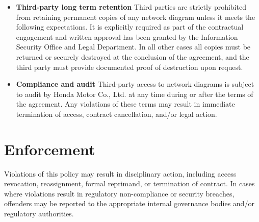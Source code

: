 \begin{itemize}
    \item \textbf{Third-party long term retention}
    Third parties are strictly prohibited from retaining permanent copies of any network diagram unless it meets the following expectations. It is explicitly required as part of the contractual engagement and written approval has been granted by the Information Security Office and Legal Department. In all other cases all copies must be returned or securely destroyed at the conclusion of the agreement, and the third party must provide documented proof of destruction upon request.
    \item \textbf{Compliance and audit}
    Third-party access to network diagrams is subject to audit by Honda Motor Co., Ltd. at any time during or after the terms of the agreement. Any violations of these terms may result in immediate termination of access, contract cancellation, and/or legal action.
\end{itemize}
\section{Enforcement}
Violations of this policy may result in disciplinary action, including access revocation, reassignment, formal reprimand, or termination of contract. In cases where violations result in regulatory non-compliance or security breaches, offenders may be reported to the appropriate internal governance bodies and/or regulatory authorities.
